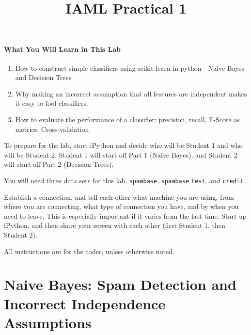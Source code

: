 \documentclass{article}
\begin{document}
\title{IAML Practical 1}

\maketitle

\paragraph{What You Will Learn in This Lab}

\begin{enumerate}
\item How to construct simple classifiers using scikit-learn in python---Naive Bayes and Decision Trees 
\item Why making an incorrect assumption that all features are independent makes it easy to fool classifiers. 
\item How to evaluate the performance of a classifier: precision, recall, F-Score as metrics. Cross-validation 
\end{enumerate} 

To prepare for the lab, start iPython and decide who will be Student 1 and who will be Student 2. Student 1 will start off Part 1 (Naive Bayes), and Student 2 will start off Part 2 (Decision Trees).

You will need three data sets for this lab, \texttt{spambase}, \texttt{spambase$\_$test}, and \texttt{credit}.

Establish a connection, and tell each other what machine you are using, from where you are connecting, what type of connection you have, and by when you need to leave. This is especially important if it varies from the last time. Start up iPython, and then share your screen with each other (first Student 1, then Student 2). 

All instructions are for the coder, unless otherwise noted. 

\section{Naive Bayes: Spam Detection and Incorrect Independence Assumptions}
\end{document}
